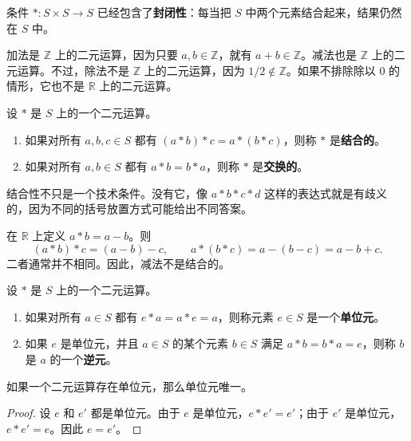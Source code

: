 条件 $*:S\times S\to S$ 已经包含了\textbf{封闭性}：每当把 $S$ 中两个元素结合起来，结果仍然在 $S$ 中。

\begin{example}[运算与非运算]
加法是 $\mathbb{Z}$ 上的二元运算，因为只要 $a,b\in\mathbb{Z}$，就有 $a+b\in\mathbb{Z}$。减法也是 $\mathbb{Z}$ 上的二元运算。不过，除法不是 $\mathbb{Z}$ 上的二元运算，因为 $1/2\notin\mathbb{Z}$。如果不排除除以 $0$ 的情形，它也不是 $\mathbb{R}$ 上的二元运算。
\end{example}

\begin{definition}[结合性与交换性]
设 $*$ 是 $S$ 上的一个二元运算。
\begin{enumerate}
    \item 如果对所有 $a,b,c\in S$ 都有 $(a*b)*c=a*(b*c)$，则称 $*$ 是\textbf{结合的}。
    \item 如果对所有 $a,b\in S$ 都有 $a*b=b*a$，则称 $*$ 是\textbf{交换的}。
\end{enumerate}
\end{definition}

结合性不只是一个技术条件。没有它，像 $a*b*c*d$ 这样的表达式就是有歧义的，因为不同的括号放置方式可能给出不同答案。

\begin{example}[一个非结合运算]
在 $\mathbb{R}$ 上定义 $a*b=a-b$。则
\[
    (a*b)*c=(a-b)-c,
    \qquad
    a*(b*c)=a-(b-c)=a-b+c.
\]
二者通常并不相同。因此，减法不是结合的。
\end{example}

\begin{definition}[单位元与逆元]
设 $*$ 是 $S$ 上的一个二元运算。
\begin{enumerate}
    \item 如果对所有 $a\in S$ 都有 $e*a=a*e=a$，则称元素 $e\in S$ 是一个\textbf{单位元}。
    \item 如果 $e$ 是单位元，并且 $a\in S$ 的某个元素 $b\in S$ 满足 $a*b=b*a=e$，则称 $b$ 是 $a$ 的一个\textbf{逆元}。
\end{enumerate}
\end{definition}

\begin{proposition}[单位元的唯一性]
如果一个二元运算存在单位元，那么单位元唯一。
\end{proposition}

\begin{proof}
设 $e$ 和 $e'$ 都是单位元。由于 $e$ 是单位元，$e*e'=e'$；由于 $e'$ 是单位元，$e*e'=e$。因此 $e=e'$。
\end{proof}

